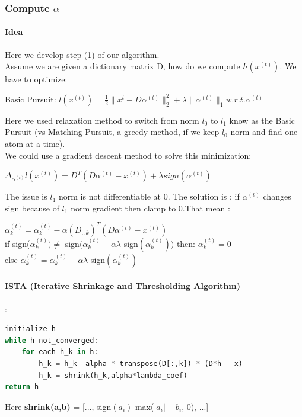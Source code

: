 \documentclass[a4paper,10pt]{article}
\begin{document}
\subsubsection{Compute $\alpha$ }
\paragraph{Idea}
Here we develop  step (1) of our algorithm.\\
Assume we are given a dictionary matrix D, how do we compute $h(x^{(t)})$. We have to optimize:
\begin{center}  Basic Pursuit:
$l(x^{(t)}) = \frac{1}{2} \| x^{t}- D \alpha^{(t)} \|^{2}_{2} + \lambda \|\alpha^{(t)}\|_1 w.r.t. \alpha^{(t)}$\\ 
\end{center} 
Here we used relaxation method to switch from norm $l_0$ to $l_1$ know as the  Basic Pursuit (vs Matching Pursuit, a greedy method,  if we keep $l_0$ norm and find one atom at a time).\\
We could use a gradient descent method to solve this minimization:\\
\begin{center}
$\Delta_{\alpha^{(t)}} l(x^{(t)}) = D^T (D \alpha^{(t)} - x^{(t)}) + \lambda sign(\alpha^{(t)})$
\end{center}
The issue is $l_1$ norm is not differentiable at 0. The solution is : if $\alpha^{(t)}$ changes sign because of $l_1$ norm gradient then clamp to 0.That mean :

$\alpha^{(t)}_k = \alpha^{(t)}_k   - \alpha (D_{., k})^T (D \alpha^{(t)} - x^{(t)})$\\
\indent if  sign($\alpha^{(t)}_k) \neq$ sign$(\alpha^{(t)}_k - \alpha \lambda$ sign$(\alpha^{(t)}_k) )$ then: $\alpha^{(t)}_k = 0$\\
\indent else $\alpha^{(t)}_k = \alpha^{(t)}_k - \alpha \lambda$ sign$(\alpha^{(t)}_k)$
\paragraph{ISTA (Iterative Shrinkage and Thresholding Algorithm)}
:
\begin{lstlisting}[language=Python,frame=single]
initialize h 
while h not_converged:
    for each h_k in h:
        h_k = h_k -alpha * transpose(D[:,k]) * (D*h - x)
        h_k = shrink(h_k,alpha*lambda_coef)
return h
\end{lstlisting}
Here \textbf{shrink(a,b) }= [..., sign$(a_i)$ max($|a_i| - b_i$, 0), ...]\\
\end{document}

